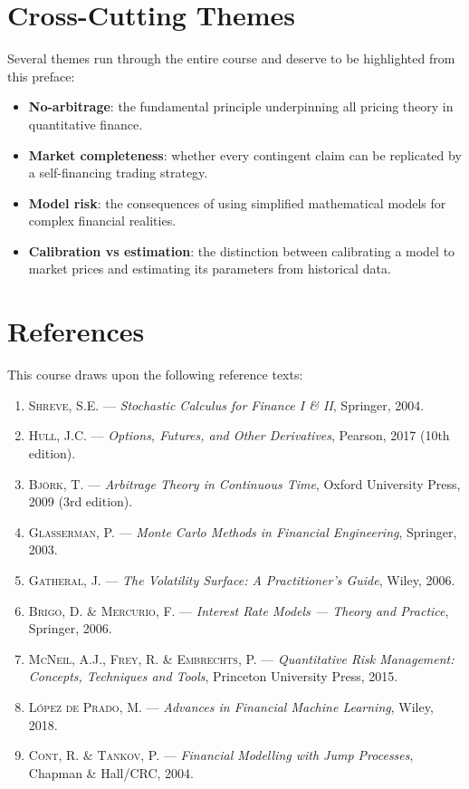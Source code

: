 \section*{Cross-Cutting Themes}

Several themes run through the entire course and deserve to be highlighted
from this preface:

\begin{itemize}
    \item \textbf{No-arbitrage}: the fundamental principle underpinning all
          pricing theory in quantitative finance.
    \item \textbf{Market completeness}: whether every contingent claim can be
          replicated by a self-financing trading strategy.
    \item \textbf{Model risk}: the consequences of using simplified mathematical
          models for complex financial realities.
    \item \textbf{Calibration vs estimation}: the distinction between calibrating
          a model to market prices and estimating its parameters from historical
          data.
\end{itemize}

\section*{References}

This course draws upon the following reference texts:

\begin{enumerate}
    \item \textsc{Shreve}, S.E. --- \textit{Stochastic Calculus for Finance
          I \& II}, Springer, 2004.
    \item \textsc{Hull}, J.C. --- \textit{Options, Futures, and Other Derivatives},
          Pearson, 2017 (10th edition).
    \item \textsc{Bj\"ork}, T. --- \textit{Arbitrage Theory in Continuous Time},
          Oxford University Press, 2009 (3rd edition).
    \item \textsc{Glasserman}, P. --- \textit{Monte Carlo Methods in Financial
          Engineering}, Springer, 2003.
    \item \textsc{Gatheral}, J. --- \textit{The Volatility Surface: A Practitioner's
          Guide}, Wiley, 2006.
    \item \textsc{Brigo}, D. \& \textsc{Mercurio}, F. --- \textit{Interest Rate
          Models --- Theory and Practice}, Springer, 2006.
    \item \textsc{McNeil}, A.J., \textsc{Frey}, R. \& \textsc{Embrechts}, P.
          --- \textit{Quantitative Risk Management: Concepts, Techniques and Tools},
          Princeton University Press, 2015.
    \item \textsc{L\'opez de Prado}, M. --- \textit{Advances in Financial Machine
          Learning}, Wiley, 2018.
    \item \textsc{Cont}, R. \& \textsc{Tankov}, P. --- \textit{Financial Modelling
          with Jump Processes}, Chapman \& Hall/CRC, 2004.
\end{enumerate}

